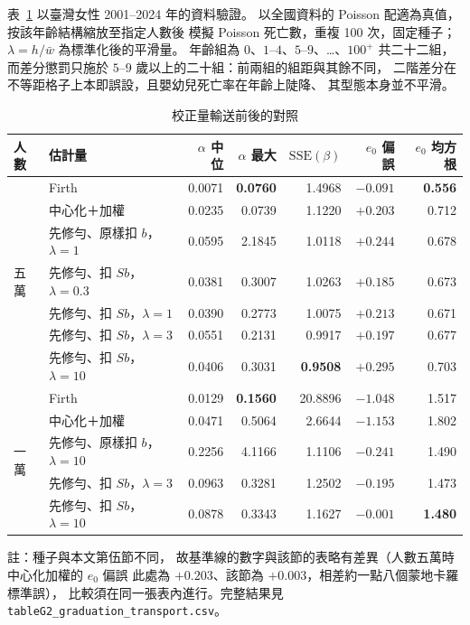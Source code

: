 \documentclass[UTF8, fontset=macnew, a4paper, 12pt]{ctexart}
\begin{document}
表~\ref{tab:transport} 以臺灣女性 2001--2024 年的資料驗證。
以全國資料的 Poisson 配適為真值，按該年齡結構縮放至指定人數後
模擬 Poisson 死亡數，重複 100 次，固定種子；
$\lambda=h/\bar w$ 為標準化後的平滑量。
年齡組為 $0$、$1$--$4$、$5$--$9$、\ldots、$100^+$ 共二十二組，
而差分懲罰只施於 $5$--$9$ 歲以上的二十組：前兩組的組距與其餘不同，
二階差分在不等距格子上本即誤設，且嬰幼兒死亡率在年齡上陡降、
其型態本身並不平滑。

\begin{table}[H]
\centering
\caption{校正量輸送前後的對照}
\small
\renewcommand{\arraystretch}{1.1}
\begin{tabular}{llrrrrr}
\toprule
人數 & 估計量 & $\alpha$ 中位 & $\alpha$ 最大 & $\mathrm{SSE}(\beta)$ & $e_0$ 偏誤 & $e_0$ 均方根\\
\midrule
\multirow{7}{*}{五萬}
 & Firth                            & 0.0071 & \textbf{0.0760} & 1.4968 & $-0.091$ & \textbf{0.556}\\
 & 中心化＋加權                      & 0.0235 & 0.0739 & 1.1220 & $+0.203$ & 0.712\\
 & 先修勻、原樣扣 $b$，$\lambda=1$    & 0.0595 & 2.1845 & 1.0118 & $+0.244$ & 0.678\\
 & 先修勻、扣 $Sb$，$\lambda=0.3$     & 0.0381 & 0.3007 & 1.0263 & $+0.185$ & 0.673\\
 & 先修勻、扣 $Sb$，$\lambda=1$       & 0.0390 & 0.2773 & 1.0075 & $+0.213$ & 0.671\\
 & 先修勻、扣 $Sb$，$\lambda=3$       & 0.0551 & 0.2131 & 0.9917 & $+0.197$ & 0.677\\
 & 先修勻、扣 $Sb$，$\lambda=10$      & 0.0406 & 0.3031 & \textbf{0.9508} & $+0.295$ & 0.703\\
\midrule
\multirow{5}{*}{一萬}
 & Firth                            & 0.0129 & \textbf{0.1560} & 20.8896 & $-1.048$ & 1.517\\
 & 中心化＋加權                      & 0.0471 & 0.5064 & 2.6644 & $-1.153$ & 1.802\\
 & 先修勻、原樣扣 $b$，$\lambda=10$   & 0.2256 & 4.1166 & 1.1106 & $-0.241$ & 1.490\\
 & 先修勻、扣 $Sb$，$\lambda=3$       & 0.0963 & 0.3281 & 1.2502 & $-0.195$ & 1.473\\
 & 先修勻、扣 $Sb$，$\lambda=10$      & 0.0878 & 0.3343 & 1.1627 & $\mathbf{-0.001}$ & \textbf{1.480}\\
\bottomrule
\end{tabular}

\vspace{2pt}
\parbox{0.92\textwidth}{\footnotesize 註：種子與本文第伍節不同，
故基準線的數字與該節的表略有差異（人數五萬時中心化加權的 $e_0$ 偏誤
此處為 $+0.203$、該節為 $+0.003$，相差約一點八個蒙地卡羅標準誤），
比較須在同一張表內進行。完整結果見 \texttt{tableG2\_graduation\_transport.csv}。}
\label{tab:transport}
\end{table}
\end{document}
